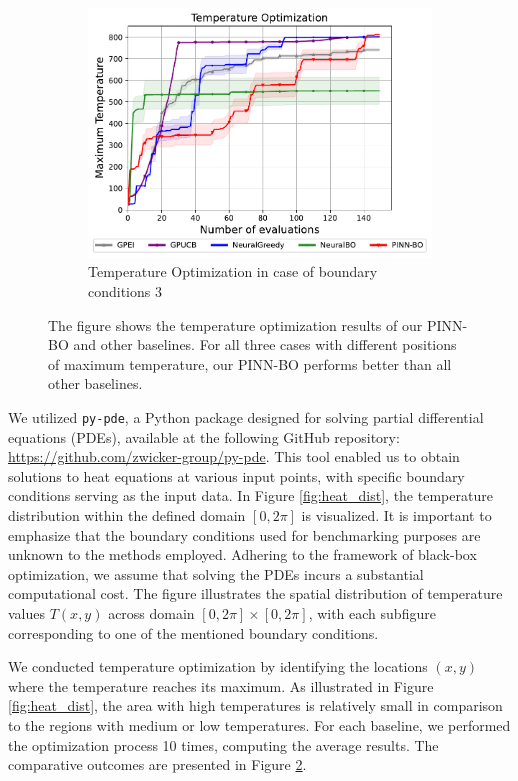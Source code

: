 \begin{figure}[H]
\begin{subfigure}[b]{0.5\textwidth}
        \centering
        \includegraphics[width=\textwidth]{Figures/PINN-BO/Heat_dim_2_bc3.pdf}
        \caption{Temperature Optimization in case of boundary conditions 3}
        \label{fig:heat_3_opt}
    \end{subfigure}
    \caption{The figure shows the temperature optimization results of our PINN-BO and other baselines. For all three cases with different positions of maximum temperature, our PINN-BO performs better than all other baselines.}
    \label{fig:heat_opt}
\end{figure}
We utilized \texttt{py-pde}, a Python package designed for solving partial differential equations (PDEs), available at the following GitHub repository: \url{https://github.com/zwicker-group/py-pde}. This tool enabled us to obtain solutions to heat equations at various input points, with specific boundary conditions serving as the input data. In Figure \ref{fig:heat_dist}, the temperature distribution within the defined domain $[0, 2\pi]$ is visualized. It is important to emphasize that the boundary conditions used for benchmarking purposes are unknown to the methods employed. Adhering to the framework of black-box optimization, we assume that solving the PDEs incurs a substantial computational cost. The figure illustrates the spatial distribution of temperature values $T(x,y)$ across domain $[0, 2\pi] \times [0, 2\pi]$, with each subfigure corresponding to one of the mentioned boundary conditions. 

We conducted temperature optimization by identifying the locations $(x,y)$ where the temperature reaches its maximum. As illustrated in Figure \ref{fig:heat_dist}, the area with high temperatures is relatively small in comparison to the regions with medium or low temperatures. For each baseline, we performed the optimization process 10 times, computing the average results. The comparative outcomes are presented in Figure \ref{fig:heat_opt}. 

